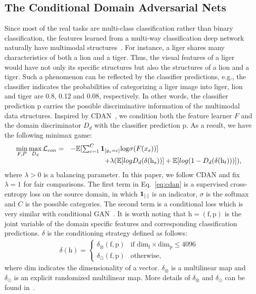 \documentclass[sigconf]{acmart}
\begin{document}
\subsection{The Conditional Domain Adversarial Nets}
Since most of the real tasks are multi-class classification rather than binary classification, the features learned from a multi-way classification deep network naturally have multimodal structures~\cite{long2018conditional}. For instance, a liger shares many characteristics of both a lion and a tiger. Thus, the visual features of a liger would have not only its specific structures but also the structures of a lion and a tiger. Such a phenomenon can be reflected by the classifier predictions, e.g., the classifier indicates the probabilities of categorizing a liger image into liger, lion and tiger are 0.8, 0.12 and 0.08, respectively. In other words, the classifier prediction $\mathrm{p}$ carries the possible discriminative information of the multimodal data structures. Inspired by CDAN~\cite{long2018conditional}, we condition both the feature learner $F$ and the domain discriminator $D_d$ with the classifier prediction $\mathrm{p}$. As a result, we have the following minimax game:
\begin{equation}
\label{eq:cdan}
  \begin{array}{l}
\min\limits_{F,P}\max\limits_{D_d} \mathcal{L}_{con}= ~~-\mathbb{E}[\sum_{c=1}^{C}{\bf 1}_{[y_s=c]}\mathrm{log} \sigma(F(x_s))] \\ 
 ~~~~~~~~~~~~~~~~~~~ \hspace{65pt}+ \lambda (\mathbb{E}[logD_d(\mathcal{\delta}(\mathrm{h}_s))]+\mathbb{E}[log(1-D_d(\mathcal{\delta}(\mathrm{h}_t)))]),
\end{array} 
\end{equation} 
where $\lambda>0$ is a balancing parameter. In this paper, we follow CDAN and fix $\lambda=1$ for fair comparisons. The first term in Eq.~\eqref{eq:cdan} is a supervised cross-entropy loss on the source domain, in which ${\bf 1}_{[\cdot]}$ is an indicator, $\sigma$ is the softmax and $C$ is the possible categories. The second term is a conditional loss which is very similar with conditional GAN~\cite{mirza2014conditional}. It is worth noting that $\mathrm{h=(f,p)}$ is the joint variable of the domain specific features and corresponding classification predictions. $\delta$ is the conditioning strategy defined as follows:
\begin{equation}
\label{eq:delta}
  \begin{array}{l}
 \delta(\mathrm{h})=\begin{cases}
\delta_\otimes \mathrm{(f,p)}& \text{if $\mathrm{dim}_\mathrm{f} \times \mathrm{dim}_\mathrm{p} \le 4096$}\\
\delta_\odot \mathrm{(f,p)}& \text{otherwise,}
\end{cases}
\end{array} 
\end{equation} 
where $\mathrm{dim}$ indicates the dimensionality of a vector. $\delta_\otimes$ is a multilinear map and $\delta_\odot$ is an explicit randomized multilinear map. More details of $\delta_\otimes$ and $\delta_\odot$ can be found in~\cite{long2018conditional}.
\end{document}
